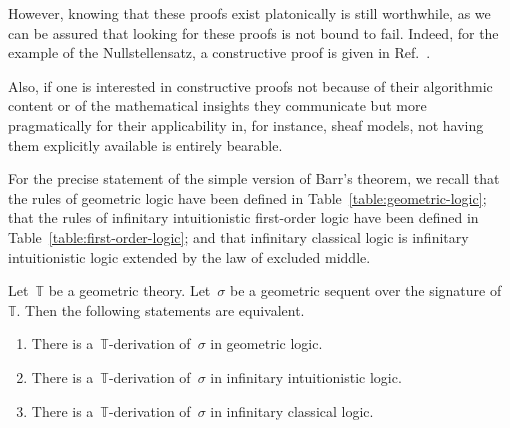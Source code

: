 \documentclass{ws-rv9x6}
\newcommand{\TT}{\mathbb{T}}
\renewcommand{\_}{\mathpunct{.}}
\newcommand{\?}{\,{:}\,}
\begin{document}
However, knowing that these proofs exist platonically is still worthwhile, as
we can be assured that looking for these proofs is not bound to fail. Indeed,
for the example of the Nullstellensatz, a constructive proof is given
in Ref.~\cite[Theorem~9.7]{lombardi-quitte:constructive-algebra}.

Also, if one is interested in constructive proofs not because of their
algorithmic content or of the mathematical insights they communicate but more
pragmatically for their applicability in, for instance, sheaf models, not
having them explicitly available is entirely bearable.

For the precise statement of the simple version of Barr's theorem, we recall
that the rules of geometric logic have been defined in
Table~\ref{table:geometric-logic}; that the rules of infinitary intuitionistic
first-order logic have been defined in Table~\ref{table:first-order-logic}; and
that infinitary classical logic is infinitary intuitionistic logic extended by
the law of excluded middle.
\begin{theorem}
\label{thm:baby-barr}
Let~$\TT$ be a geometric theory.
Let~$\sigma$ be a geometric sequent over the signature of~$\TT$. Then the
following statements are equivalent.
\begin{enumerate}
\item There is a~$\TT$-derivation of~$\sigma$ in geometric logic.
\item There is a~$\TT$-derivation of~$\sigma$ in infinitary intuitionistic
logic.
\item There is a~$\TT$-derivation of~$\sigma$ in infinitary classical logic.
\end{enumerate}
\end{theorem}
\end{document}
